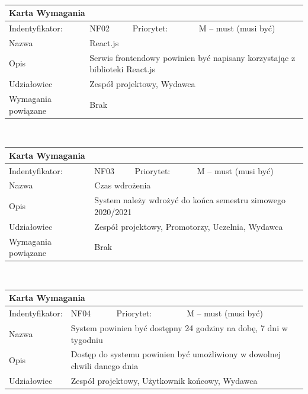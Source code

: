 \documentclass[a4paper,11pt]{report}
\begin{document}
\begin{itemize}
\begin{tabular}{|p{3cm}|p{2cm}|p{2cm}|p{6cm}|}
		\hline
		\end{tabular}\\
		\begin{tabular}{|p{3cm}|p{2cm}|p{2cm}|p{6cm}|}
		\hline
		\multicolumn{4}{|p{12 cm}|}{Karta Wymagania}\\
		\hline
		Indentyfikator: & NF02 & Priorytet: & M – must (musi być)\\
		\hline
		Nazwa & \multicolumn{3}{|p{10 cm}|}{React.js}\\
		\hline
		Opis & \multicolumn{3}{|p{10 cm}|}{Serwis frontendowy powinien być napisany korzystając z biblioteki React.js}\\
		\hline
		Udziałowiec & \multicolumn{3}{|p{10 cm}|}{Zespół projektowy, Wydawca}\\
		\hline
		Wymagania powiązane & \multicolumn{3}{|p{10 cm}|}{Brak}\\
		\hline
		\end{tabular}\\
		\begin{tabular}{|p{3cm}|p{2cm}|p{2cm}|p{6cm}|}
		\hline
		\multicolumn{4}{|p{12 cm}|}{Karta Wymagania}\\
		\hline
		Indentyfikator: & NF03 & Priorytet: & M – must (musi być)\\
		\hline
		Nazwa & \multicolumn{3}{|p{10 cm}|}{Czas wdrożenia }\\
		\hline
		Opis & \multicolumn{3}{|p{10 cm}|}{System należy wdrożyć do końca semestru zimowego 2020/2021}\\
		\hline
		Udziałowiec & \multicolumn{3}{|p{10 cm}|}{Zespół projektowy, Promotorzy, Uczelnia, Wydawca}\\
		\hline
		Wymagania powiązane & \multicolumn{3}{|p{10 cm}|}{Brak}\\
		\hline
		\end{tabular}\\
		\begin{tabular}{|p{3cm}|p{2cm}|p{2cm}|p{6cm}|}
		\hline
		\multicolumn{4}{|p{12 cm}|}{Karta Wymagania}\\
		\hline
		Indentyfikator: & NF04 & Priorytet: & M – must (musi być)\\
		\hline
		Nazwa & \multicolumn{3}{|p{10 cm}|}{System powinien być dostępny 24 godziny na dobę, 7 dni w tygodniu}\\
		\hline
		Opis & \multicolumn{3}{|p{10 cm}|}{Dostęp do systemu powinien być umożliwiony w dowolnej chwili danego dnia}\\
		\hline
		Udziałowiec & \multicolumn{3}{|p{10 cm}|}{Zespół projektowy, Użytkownik końcowy, Wydawca}\\

\end{tabular}
\end{itemize}
\end{document}
